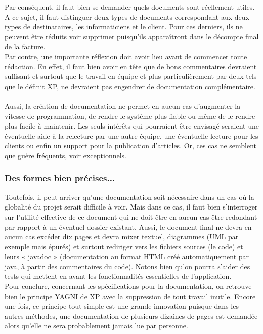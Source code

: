\documentclass[]{article}
\begin{document}
Par conséquent, il faut bien se demander quels documents sont réellement
utiles. A ce sujet, il faut distinguer deux types de documents
correspondant aux deux types de destinataires, les informaticiens et le
client. Pour ces derniers, ils ne peuvent être réduits voir supprimer
puisqu'ils apparaîtront dans le décompte final de la facture.\\
Par contre, une importante réflexion doit avoir lieu avant de commencer
toute rédaction. En effet, il faut bien avoir en tête que de bons
commentaires devraient suffisant et surtout que le travail en équipe et
plus particulièrement par deux tels que le définit XP, ne devraient pas
engendrer de documentation complémentaire.\\
~\\
Aussi, la création de documentation ne permet en aucun cas d'augmenter
la vitesse de programmation, de rendre le système plus fiable ou même de
le rendre plus facile à maintenir. Les seuls intérêts qui pourraient
être envisagé seraient une éventuelle aide à la relecture par une autre
équipe, une éventuelle lecture pour les clients ou enfin un support pour
la publication d'articles. Or, ces cas ne semblent que guère fréquents,
voir exceptionnels.




\hypertarget{des-formes-bien-pruxe9cises...}{%
\subsubsection{Des formes bien
précises...}\label{des-formes-bien-pruxe9cises...}}

Toutefois, il peut arriver qu'une documentation soit nécessaire dans un
cas où la globalité du projet serait difficile à voir. Mais dans ce cas,
il faut bien s'interroger sur l'utilité effective de ce document qui ne
doit être en aucun cas être redondant par rapport à un éventuel dossier
existant. Aussi, le document final ne devra en aucun cas excéder dix
pages et devra mixer textuel, diagrammes (UML par exemple mais épurés)
et surtout rediriger vers les fichiers sources (le code) et leurs «
javadoc » (documentation au format HTML créé automatiquement par java, à
partir des commentaires du code). Notons bien qu'on pourra s'aider des
tests qui mettent en avant les fonctionnalités essentielles de
l'application.\\
Pour conclure, concernant les spécifications pour la documentation, on
retrouve bien le principe YAGNI de XP avec la suppression de tout
travail inutile. Encore une fois, ce principe tout simple est une grande
innovation puisque dans les autres méthodes, une documentation de
plusieurs dizaines de pages est demandée alors qu'elle ne sera
probablement jamais lue par personne.
\end{document}

